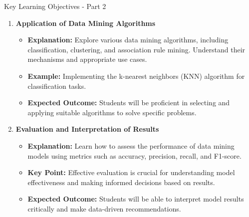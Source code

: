 \documentclass[aspectratio=169]{beamer}
\begin{document}
\begin{frame}[fragile]{Key Learning Objectives - Part 2}
    \begin{enumerate}[resume]
        \item \textbf{Application of Data Mining Algorithms}
        \begin{itemize}
            \item \textbf{Explanation:} Explore various data mining algorithms, including classification, clustering, and association rule mining. Understand their mechanisms and appropriate use cases.
            \item \textbf{Example:} Implementing the k-nearest neighbors (KNN) algorithm for classification tasks.
            \item \textbf{Expected Outcome:} Students will be proficient in selecting and applying suitable algorithms to solve specific problems.
        \end{itemize}

        \item \textbf{Evaluation and Interpretation of Results}
        \begin{itemize}
            \item \textbf{Explanation:} Learn how to assess the performance of data mining models using metrics such as accuracy, precision, recall, and F1-score.
            \item \textbf{Key Point:} Effective evaluation is crucial for understanding model effectiveness and making informed decisions based on results.
            \item \textbf{Expected Outcome:} Students will be able to interpret model results critically and make data-driven recommendations.
        \end{itemize}
    \end{enumerate}
\end{frame}
\end{document}
